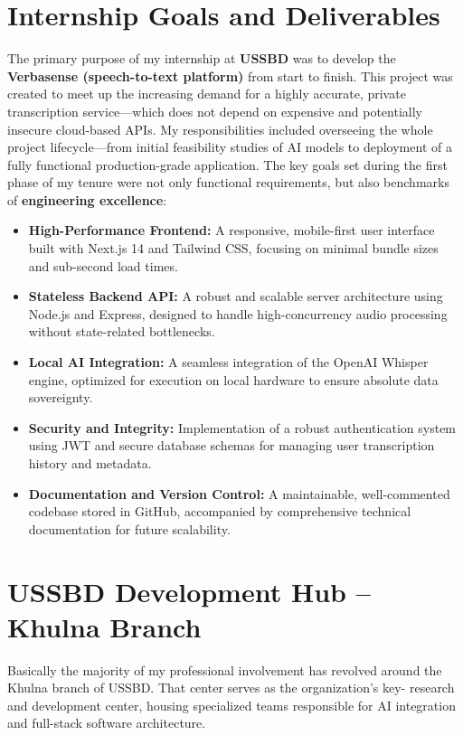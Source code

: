 \documentclass[oneside]{thesis-library}
\begin{document}
\section{Internship Goals and Deliverables}
The primary purpose of my internship at \textbf{USSBD} was to develop the \textbf{Verbasense (speech-to-text platform)} from start to finish. This project was created to meet up the increasing demand for a highly accurate, private transcription service---which does not depend on expensive and potentially insecure cloud-based APIs. My responsibilities included overseeing the whole project lifecycle---from initial feasibility studies of AI models to deployment of a fully functional production-grade application. The key goals set during the first phase of my tenure were not only functional requirements, but also benchmarks of \textbf{engineering excellence}:
\begin{itemize}
    \item \textbf{High-Performance Frontend:} A responsive, mobile-first user interface built with Next.js 14 and Tailwind CSS, focusing on minimal bundle sizes and sub-second load times.
    \item \textbf{Stateless Backend API:} A robust and scalable server architecture using Node.js and Express, designed to handle high-concurrency audio processing without state-related bottlenecks.
    \item \textbf{Local AI Integration:} A seamless integration of the OpenAI Whisper engine, optimized for execution on local hardware to ensure absolute data sovereignty.
    \item \textbf{Security and Integrity:} Implementation of a robust authentication system using JWT and secure database schemas for managing user transcription history and metadata.
    \item \textbf{Documentation and Version Control:} A maintainable, well-commented codebase stored in GitHub, accompanied by comprehensive technical documentation for future scalability.
\end{itemize}

\section{USSBD Development Hub – Khulna Branch}
Basically the majority of my professional involvement has revolved around the Khulna branch of USSBD. That center serves as the organization's key- research and development center, housing specialized teams responsible for AI integration and full-stack software architecture.
\end{document}

